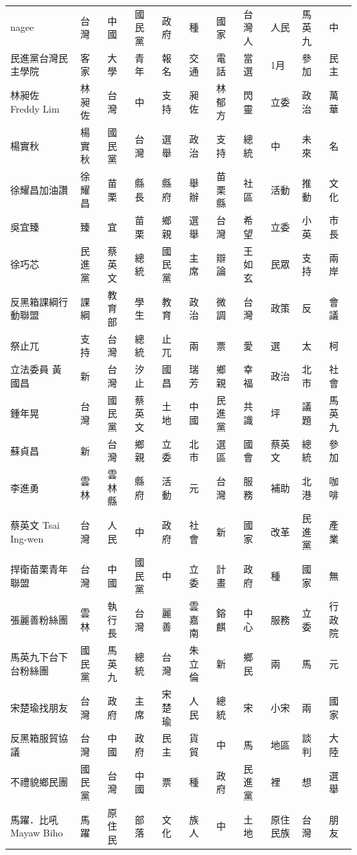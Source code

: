 \documentclass[letterpaper, 10pt, conference]{ieeeconf}   %
\begin{document}
\begin{CJK}{UTF8}{bsmi}
\begin{longtable}[c]{@{}L{2.45cm}L{1.1cm}L{1.1cm}L{1.1cm}L{1.1cm}L{1.1cm}L{1.1cm}L{1.1cm}L{1.1cm}L{1.1cm}L{1.1cm}@{}}
nagee & 台灣 & 中國 & 國民黨 & 政府 & 種 & 國家 & 台灣人 & 人民 & 馬英九 & 中 \\
民進黨台灣民主學院 & 客家 & 大學 & 青年 & 報名 & 交通 & 電話 & 當選 & 1月 & 參加 & 民主 \\
林昶佐 Freddy Lim & 林昶佐 & 台灣 & 中 & 支持 & 昶佐 & 林郁方 & 閃靈 & 立委 & 政治 & 萬華 \\
楊實秋 & 楊實秋 & 國民黨 & 台灣 & 選舉 & 政治 & 支持 & 總統 & 中 & 未來 & 名 \\
徐耀昌加油讚 & 徐耀昌 & 苗栗 & 縣長 & 縣府 & 舉辦 & 苗栗縣 & 社區 & 活動 & 推動 & 文化 \\
吳宜臻 & 臻 & 宜 & 苗栗 & 鄉親 & 選舉 & 台灣 & 希望 & 立委 & 小英 & 市長 \\
徐巧芯 & 民進黨 & 蔡英文 & 總統 & 國民黨 & 主席 & 辯論 & 王如玄 & 民眾 & 支持 & 兩岸 \\
反黑箱課綱行動聯盟 & 課綱 & 教育部 & 學生 & 教育 & 政治 & 微調 & 台灣 & 政策 & 反 & 會議 \\
祭止兀 & 支持 & 台灣 & 總統 & 止兀 & 兩 & 票 & 愛 & 選 & 太 & 柯 \\
立法委員 黃國昌 & 新 & 台灣 & 汐止 & 國昌 & 瑞芳 & 鄉親 & 幸福 & 政治 & 北市 & 社會 \\
鍾年晃 & 台灣 & 國民黨 & 蔡英文 & 土地 & 中國 & 民進黨 & 共識 & 坪 & 議題 & 馬英九 \\
蘇貞昌 & 新 & 台灣 & 鄉親 & 立委 & 北市 & 選區 & 國會 & 蔡英文 & 總統 & 參加 \\
李進勇 & 雲林 & 雲林縣 & 縣府 & 活動 & 元 & 台灣 & 服務 & 補助 & 北港 & 咖啡 \\
蔡英文 Tsai Ing-wen & 台灣 & 人民 & 中 & 政府 & 社會 & 新 & 國家 & 改革 & 民進黨 & 產業 \\
捍衛苗栗青年聯盟 & 台灣 & 中國 & 國民黨 & 中 & 立委 & 計畫 & 政府 & 種 & 國家 & 無 \\
張麗善粉絲團 & 雲林 & 執行長 & 台灣 & 麗善 & 雲嘉南 & 鎔麒 & 中心 & 服務 & 立委 & 行政院 \\
馬英九下台下台粉絲團 & 國民黨 & 馬英九 & 總統 & 台灣 & 朱立倫 & 新 & 鄉民 & 兩 & 馬 & 元 \\
宋楚瑜找朋友 & 台灣 & 政府 & 主席 & 宋楚瑜 & 人民 & 總統 & 宋 & 小宋 & 兩 & 國家 \\
反黑箱服貿協議 & 台灣 & 中國 & 政府 & 民主 & 貨貿 & 中 & 馬 & 地區 & 談判 & 大陸 \\
不禮貌鄉民團 & 國民黨 & 台灣 & 中國 & 票 & 種 & 政府 & 民進黨 & 裡 & 想 & 選舉 \\
馬躍．比吼 Mayaw Biho & 馬躍 & 原住民 & 部落 & 文化 & 族人 & 中 & 土地 & 原住民族 & 台灣 & 朋友 \\

\end{longtable}
\end{CJK}
\end{document}
